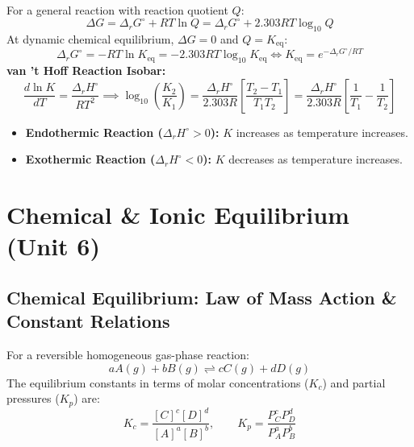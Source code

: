 \documentclass[10pt,a4paper]{article}
\begin{document}
\begin{formulabox}
For a general reaction with reaction quotient $Q$:
\begin{equation}
  \Delta G = \Delta_r G^\circ + R T \ln Q = \Delta_r G^\circ + 2.303 R T \log_{10} Q
\end{equation}
At dynamic chemical equilibrium, $\Delta G = 0$ and $Q = K_{\text{eq}}$:
\begin{equation}
  \Delta_r G^\circ = -R T \ln K_{\text{eq}} = -2.303 R T \log_{10} K_{\text{eq}} \iff K_{\text{eq}} = e^{-\Delta_r G^\circ / R T}
\end{equation}
\textbf{van 't Hoff Reaction Isobar:}
\begin{equation}
  \frac{d \ln K}{d T} = \frac{\Delta_r H^\circ}{R T^2} \implies \log_{10}\left(\frac{K_2}{K_1}\right) = \frac{\Delta_r H^\circ}{2.303 R}\left[\frac{T_2 - T_1}{T_1 T_2}\right] = \frac{\Delta_r H^\circ}{2.303 R}\left[\frac{1}{T_1} - \frac{1}{T_2}\right]
\end{equation}
\begin{itemize}
  \item \textbf{Endothermic Reaction ($\Delta_r H^\circ > 0$):} $K$ increases as temperature increases.
  \item \textbf{Exothermic Reaction ($\Delta_r H^\circ < 0$):} $K$ decreases as temperature increases.
\end{itemize}
\end{formulabox}

\section{Chemical \& Ionic Equilibrium (Unit 6)}

\subsection{Chemical Equilibrium: Law of Mass Action \& Constant Relations}
For a reversible homogeneous gas-phase reaction:
\begin{equation}
  aA(g) + bB(g) \rightleftharpoons cC(g) + dD(g)
\end{equation}
The equilibrium constants in terms of molar concentrations ($K_c$) and partial pressures ($K_p$) are:
\begin{equation}
  K_c = \frac{[C]^c [D]^d}{[A]^a [B]^b}, \qquad K_p = \frac{P_C^c P_D^d}{P_A^a P_B^b}
\end{equation}
\end{document}
